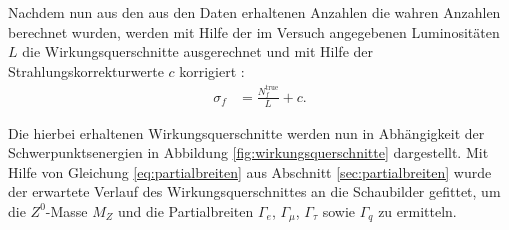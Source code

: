 Nachdem nun aus den aus den Daten erhaltenen Anzahlen die wahren Anzahlen berechnet wurden, werden mit Hilfe der im Versuch angegebenen Luminositäten $L$ die Wirkungsquerschnitte ausgerechnet und mit Hilfe der Strahlungskorrekturwerte $c$ korrigiert \cite{anleitungalt}:
\begin{align}
	\sigma_f&=\frac{N_f^\text{true}}{L}+c\text{.}
\end{align}

Die hierbei erhaltenen Wirkungsquerschnitte werden nun in Abhängigkeit der Schwerpunktsenergien in Abbildung \ref{fig:wirkungsquerschnitte} dargestellt. Mit Hilfe von Gleichung \ref{eq:partialbreiten} aus Abschnitt \ref{sec:partialbreiten} wurde der erwartete Verlauf des Wirkungsquerschnittes an die Schaubilder gefittet, um die $Z^0$-Masse $M_Z$ und die Partialbreiten $\Gamma_e$, $\Gamma_\mu$, $\Gamma_\tau$ sowie $\Gamma_q$ zu ermitteln.\\


